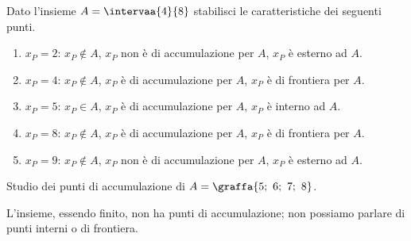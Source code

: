 
\begin{esempio}
Dato l'insieme \(A = \intervaa{4}{8}\) 
stabilisci le caratteristiche dei seguenti punti.
\begin{enumerate} [label=\alph*)]
\item \(x_P= 2\): \quad  \(x_P \notin A\), 
\(x_P\) non è di accumulazione per \(A\), \(x_P\) è esterno ad \(A\).
\item \(x_P= 4\): \quad  \(x_P \notin A\), 
\(x_P\) è di accumulazione per \(A\), \(x_P\) è di frontiera per \(A\).
\item \(x_P= 5\): \quad  \(x_P \in A\), 
\(x_P\) è di accumulazione per \(A\), \(x_P\) è interno ad \(A\).
\item \(x_P= 8\): \quad  \(x_P \notin A\), 
\(x_P\) è di accumulazione per \(A\), \(x_P\) è di frontiera per \(A\).
\item \(x_P= 9\): \quad  \(x_P \notin A\), 
\(x_P\) non è di accumulazione per \(A\), \(x_P\) è esterno ad \(A\).
\end{enumerate}
\end{esempio}

\begin{esempio}
Studio dei punti di accumulazione di \(A = \graffa{5;~6;~7;~8}\).

L'insieme, essendo finito, non ha punti di accumulazione; 
non possiamo parlare di punti interni o di frontiera.
\end{esempio}

